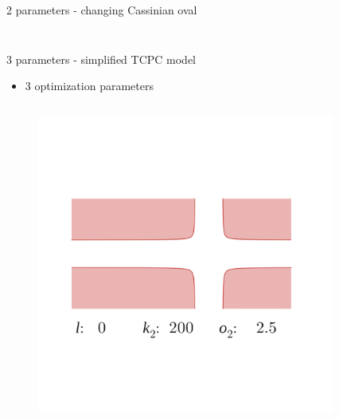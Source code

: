\documentclass[aspectratio=169,xcolor=dvipsnames]{beamer}
\begin{document}
\begin{frame}{2 parameters - changing Cassinian oval}
\begin{columns}
\begin{column}{.45\textwidth}
\begin{figure}
			\end{figure}
		\end{column}
	\end{columns}	
\end{frame}
\begin{frame}{3 parameters - simplified TCPC model}
	\begin{itemize}
		\item 3 optimization parameters
	\end{itemize}
	\begin{columns}
		\begin{column}{.58\textwidth}
			\begin{figure}
				\includegraphics[width=1.\linewidth, trim={5cm 6cm 8cm 19cm}, clip]{Images/a.png}		
			\end{figure}
		\end{column}
		\begin{column}{.42\textwidth}
			\vspace{-15mm}
			\begin{figure}

\end{figure}
\end{column}
\end{columns}
\end{frame}
\end{document}
